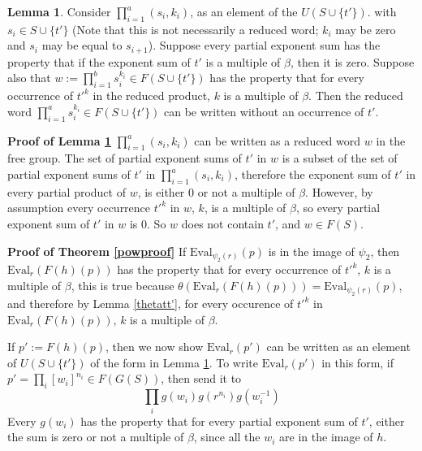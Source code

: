 \documentclass[12pt]{article} %
\theoremstyle{definition}
\theoremstyle{definition}
\theoremstyle{definition}
\theoremstyle{definition}
\newtheorem{sublemma}{Lemma}[theorem]
\theoremstyle{definition}
\theoremstyle{definition}
\begin{document}
\begin{sublemma}\label{powproof1}
  Consider $\prod_{i = 1}^a (s_i, k_i)$, as an element of the $U(S \cup \{t' \})$.
  with $s_i \in S \cup \{t'\}$ (Note that this is not necessarily a reduced
  word; $k_i$ may be zero and $s_i$ may be equal to $s_{i+1}$).
  Suppose every partial exponent sum has the property that if the exponent sum of
  $t'$ is a multiple of $\beta$, then it is zero. Suppose also that
  $w := \prod_{i = 1}^b s_i^{k_i} \in F(S \cup \{t'\})$ has the
  property that for every occurrence of $t'^k$ in the reduced product,
  $k$ is a multiple of $\beta$. Then the reduced word
  $\prod_{i = 1}^a s_i^{k_i} \in F(S \cup \{t'\})$
  can be written without an occurrence of $t'$.
\end{sublemma}

\textbf{Proof of Lemma \ref{powproof1}}
$\prod_{i = 1}^a (s_i, k_i)$ can be written as a reduced word $w$ in the free group.
The set of partial exponent sums of $t'$ in $w$
is a subset of the set of partial exponent sums of $t'$ in $\prod_{i = 1}^a (s_i, k_i)$,
therefore the exponent sum of $t'$ in every partial product of $w$, is
either $0$ or not a multiple of $\beta$.
However, by assumption every occurrence $t'^k$ in $w$, $k$,
is a multiple of $\beta$, so every partial exponent sum of $t'$ in $w$ is $0$.
So $w$ does not contain $t'$, and $w \in F(S)$.

\textbf{Proof of Theorem \ref{powproof}} \newline
If $\text{Eval}_{\psi_2(r)}(p)$ is in the image of $\psi_2$, then
$\text{Eval}_{r}(F(h)(p))$ has the property
that for every occurrence of $t'^k$, $k$ is a multiple of $\beta$,
this is true because $\theta(\text{Eval}_{r}(F(h)(p))) =
\text{Eval}_{\psi_2(r)}(p)$, and therefore by Lemma \ref{thetatt'},
for every occurence of $t'^k$ in $\text{Eval}_{r}(F(h)(p))$, $k$
is a multiple of $\beta$.

If $p' := F(h)(p)$,
then we now show $\text{Eval}_{r}(p')$ can be written as an element of $U(S \cup \{t'\})$ of the form in
Lemma \ref{powproof1}.
To write $\text{Eval}_{r}(p')$ in this
form, if $p' = \prod_i \left[w_i\right]^{n_i} \in F(G(S))$, then send it to
\begin{equation} \label{eq:bigprod}
  \prod_i g(w_i)g(r^{n_i})g(w_i^{-1})
\end{equation}
Every $g(w_i)$ has the property that for every partial exponent sum of $t'$, either
the sum is zero or not a multiple of $\beta$, since all the $w_i$ are in the image of $h$.
\end{document}
